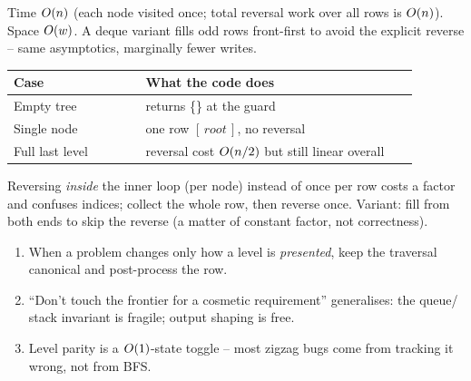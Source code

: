 
\begin{complexitybox}
Time $O(n)$ (each node visited once; total reversal work over all rows is
$O(n)$). Space $O(w)$. A deque variant fills odd rows front-first to avoid the
explicit reverse -- same asymptotics, marginally fewer writes.
\end{complexitybox}

\begin{center}\renewcommand{\arraystretch}{1.2}
\begin{tabular}{@{}p{0.30\linewidth} p{0.62\linewidth}@{}}
\toprule
\textbf{Case} & \textbf{What the code does} \\
\midrule
Empty tree & returns \{\} at the guard \\
Single node & one row $[\,\mathit{root}\,]$, no reversal \\
Full last level & reversal cost $O(n/2)$ but still linear overall \\
\bottomrule
\end{tabular}\end{center}

\begin{warningbox}
Reversing \emph{inside} the inner loop (per node) instead of once per row costs a factor
and confuses indices; collect the whole row, then reverse once. Variant: fill
 from both ends to skip the reverse (a matter of constant
factor, not correctness).
\end{warningbox}

\begin{insightbox}
\begin{enumerate}[nosep, leftmargin=1.6em]
  \item When a problem changes only how a level is \emph{presented}, keep the traversal
        canonical and post-process the row.
  \item ``Don't touch the frontier for a cosmetic requirement'' generalises: the queue/
        stack invariant is fragile; output shaping is free.
  \item Level parity is a $O(1)$-state toggle -- most zigzag bugs come from tracking it
        wrong, not from BFS.
\end{enumerate}
\end{insightbox}

